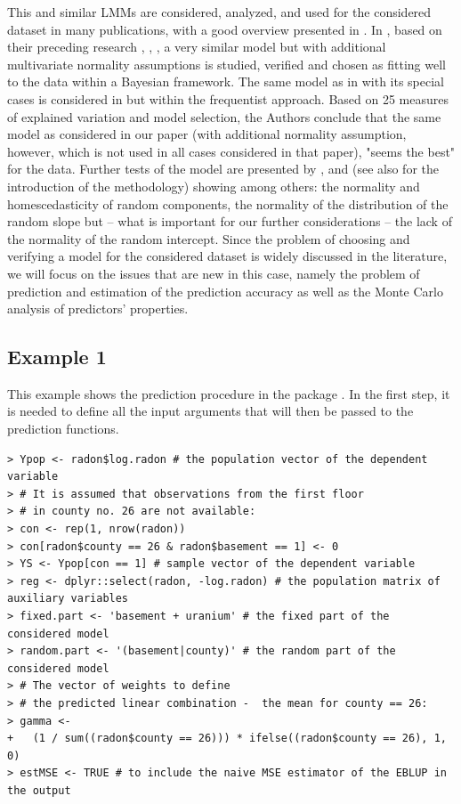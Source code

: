 This and similar LMMs are considered, analyzed, and used for the considered dataset in many publications, with a good overview presented in \cite{gelman_data_2006}. In \cite{gelman2006bayesian}, based on their preceding research \cite{price1996bayesian}, \cite{gelman1999analysis}, \cite{peck_should_2005}, a very similar model but with additional multivariate normality assumptions is studied, verified and chosen as fitting well to the data within a Bayesian framework. The same model as in \cite{gelman2006bayesian} with its special cases is considered in \cite{cantoni2021review} but within the frequentist approach. Based on 25 measures of explained variation and model selection, the Authors conclude that the same model as considered in our paper (with additional normality assumption, however, which is not used in all cases considered in that paper), "seems the best" \cite[p. 10]{cantoni2021review} for the  data. Further tests of the model are presented by \cite{loy2013diagnostics}, \cite{loy2015you} and \cite{loy2017model} (see also \cite{cook2007interactive} for the introduction of the methodology) showing among others: the normality and homescedasticity of random components, the normality of the distribution of the random slope but – what is important for our further considerations – the lack of the normality of the random intercept. Since the problem of choosing and verifying a model for the considered dataset is widely discussed in the literature, we will focus on the issues that are new in this case, namely the problem of prediction and estimation of the prediction accuracy as well as the Monte Carlo analysis of predictors' properties.

\subsection{Example 1}

This example shows the prediction procedure in the package . In the first step, it is needed to define all the input arguments that will then be passed to the prediction functions.
\begin{verbatim}
> Ypop <- radon$log.radon # the population vector of the dependent variable
> # It is assumed that observations from the first floor
> # in county no. 26 are not available:	
> con <- rep(1, nrow(radon))
> con[radon$county == 26 & radon$basement == 1] <- 0
> YS <- Ypop[con == 1] # sample vector of the dependent variable
> reg <- dplyr::select(radon, -log.radon) # the population matrix of auxiliary variables
> fixed.part <- 'basement + uranium' # the fixed part of the considered model
> random.part <- '(basement|county)' # the random part of the considered model
> # The vector of weights to define
> # the predicted linear combination -  the mean for county == 26:
> gamma <-
+   (1 / sum((radon$county == 26))) * ifelse((radon$county == 26), 1, 0)
> estMSE <- TRUE # to include the naive MSE estimator of the EBLUP in the output
\end{verbatim}

